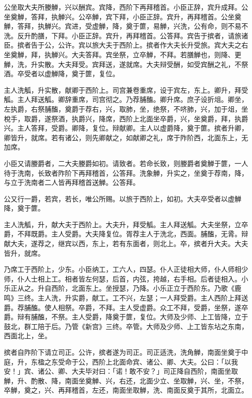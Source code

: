 \documentclass[]{article}
\begin{document}
公坐取大夫所媵觯，兴以酬宾。宾降，西阶下再拜稽首。小臣正辞，宾升成拜。公坐奠觯，答拜，执觯兴。公卒觯，宾下拜，小臣正辞。宾升，再拜稽首。公坐奠觯，答拜，执觯兴。宾进，受虚觯，降，奠于篚，易觯，兴洗，公有命，则不易不洗。反升酌膳，下拜。小臣正辞。宾升，再拜稽首。公答拜。宾告于摈者，请旅诸臣。摈者告于公，公许。宾以旅大夫于西阶上。摈者作大夫长升受旅。宾大夫之右坐奠觯，拜，执觯兴。大夫答拜。宾坐祭，立卒觯，不拜。若膳觯也，则降、更觯，洗，升实散。大夫拜受。宾拜送，遂就席。大夫辩受酬，如受宾酬之礼，不祭酒。卒受者以虚觯降，奠于篚，复位。

主人洗觚，升实散，献卿于西阶上。司宫兼卷重席，设于宾左，东上。卿升，拜受觚。主人拜送觚。卿辞重席，司宫彻之。乃荐脯醢。卿升席。庶子设折俎。卿坐，左执爵，右祭脯醢，奠爵于荐右，兴，取肺，坐，绝祭，不哜肺，兴，加于俎，坐梲手，取爵，遂祭酒，执爵兴，降席，西阶上北面坐卒爵，兴，坐奠爵，拜，执爵兴。主人答拜，受爵。卿降，复位。辩献卿。主人以虚爵降，奠于篚。摈者升卿，卿皆升，就席。若有诸公，则先卿献之，如献卿之礼，席于阼阶西，北面东上，无加席。

小臣又请媵爵者，二大夫媵爵如初。请致者。若命长致，则媵爵者奠觯于篚，一人待于洗南，长致者阼阶下再拜稽首，公答拜。洗象觯，升实之，坐奠于荐南，降，与立于洗南者二人皆再拜稽首送觯。公答拜。

公又行一爵，若宾，若长，唯公所赐。以旅于西阶上，如初。大夫卒受者以虚觯降，奠于篚。

主人洗觚，升，献大夫于西阶上。大夫升，拜受觚。主人拜送觚。大夫坐祭，立卒爵，不拜既爵。主人受爵。大夫降复位。胥荐主人于洗北，西面。脯醢，无脀。辩献大夫，遂荐之，继宾以西，东上，若有东面者，则北上。卒，摈者升大夫。大夫皆升，就席。

乃席工于西阶上，少东。小臣纳工，工六人，四瑟。仆人正徒相大师，仆人师相少师，仆人士相上工。相者皆左何瑟，后首，内弦，挎越，右手相。后者徒相入。小乐正从之。升自西阶，北面东上。坐授瑟，乃降。小乐正立于西阶东。乃歌《鹿鸣》三终。主人洗，升实爵，献工。工不兴，左瑟；一人拜受爵。主人西阶上拜送爵。荐脯醢。使人相祭。卒爵，不拜。主人受虚爵。众工不拜，受爵，坐祭，遂卒爵。辩有脯醢，不祭。主人受爵，降奠于篚，复位。大师及少师、上工皆降，立于鼓北，群工陪于后。乃管《新宫》三终。卒管。大师及少师、上工皆东坫之东南，西面北上，坐。

摈者自阼阶下请立司正。公许，摈者遂为司正。司正适洗，洗角觯，南面坐奠于中庭，升，东楹之东受命于公，西阶上北面命宾、诸公、卿、大夫。公曰：「以我安！」宾、诸公、卿、大夫毕对曰：「诺！敢不安？」司正降自西阶，南面坐取觯，升、酌散、降，南面坐奠觯、兴，右还，北面少立、坐取觯，兴、坐，不祭，卒觯，奠之，兴、再拜稽首，左还，南面坐取觯，洗、南面反奠于其所，北面立。
\end{document}
